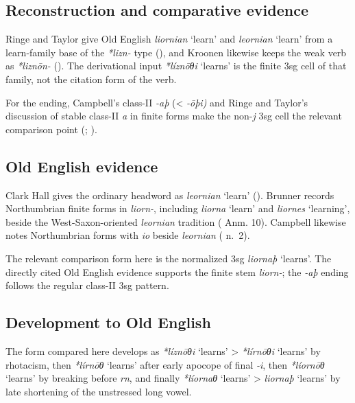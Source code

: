 \documentclass[
  british,
  a4paper,
  openany]{book}
\providecommand{\Recon}[1]{\emph{*#1}}
{\catcode`→=\active \global\def→{\ensuremath{\rightarrow}}}
\providecommand{\Recon}[1]{\emph{*#1}}
{\catcode`→=\active \global\def→{\ensuremath{\rightarrow}}}
\begin{document}
\subsection{Reconstruction and comparative
evidence}\label{reconstruction-and-comparative-evidence-131}

Ringe and Taylor give Old English {\emph{liornian}} `learn' and
{\emph{leornian}} `learn' from a learn-family base of the \emph{*lizn-}
type (), and
Kroonen likewise keeps the weak verb as \emph{*liznōn-}
(). The derivational input
{\Recon{líznōθi} `learns'} is the finite 3sg cell of that family, not
the citation form of the verb.

For the ending, Campbell's class-II \emph{-aþ} (\textless{} \emph{-ōþi)}
and Ringe and Taylor's discussion of stable class-II \emph{a} in finite
forms make the non-\emph{j} 3sg cell the relevant comparison point
(;
).

\subsection{Old English evidence}\label{old-english-evidence-131}

Clark Hall gives the ordinary headword as {\emph{leornian}} `learn'
(). Brunner records
Northumbrian finite forms in \emph{liorn-}, including {\emph{liorna}}
`learn' and {\emph{liornes}} `learning', beside the West-Saxon-oriented
{\emph{leornian}} tradition ( Anm. 10). Campbell likewise notes Northumbrian forms
with \emph{io} beside \emph{leornian}
( n.~2).

The relevant comparison form here is the normalized 3sg {\emph{liornaþ}}
`learns'. The directly cited Old English evidence supports the finite
stem \emph{liorn-}; the \emph{-aþ} ending follows the regular class-II
3sg pattern.

\subsection{Development to Old
English}\label{development-to-old-english-131}

The form compared here develops as \Recon{líznōθi} `learns'
\textgreater{} \Recon{lírnōθi} `learns' by rhotacism, then
\Recon{lírnōθ} `learns' after early apocope of final \emph{-i}, then
\Recon{líornōθ} `learns' by breaking before \emph{rn}, and finally
\Recon{líornaθ} `learns' \textgreater{} {\emph{liornaþ}} `learns' by
late shortening of the unstressed long vowel.
\end{document}
